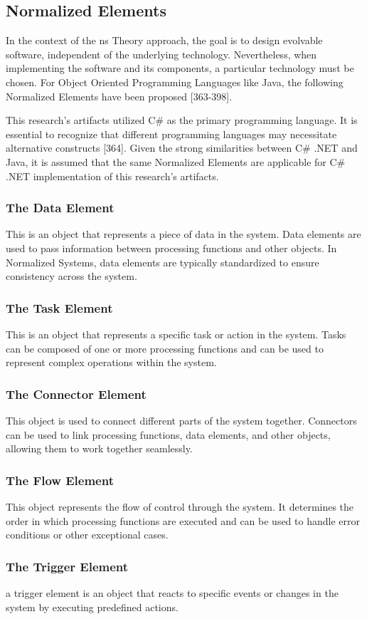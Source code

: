 \subsection{Normalized Elements} \label{subsec:ns_elements} 

In the context of the \gls{ns} Theory approach, the goal is to design evolvable software,
independent of the underlying technology. Nevertheless, when implementing the software and
its components, a particular technology must be chosen. For Object Oriented Programming
Languages like Java, the following Normalized Elements have been proposed
\parencite{mannaert_normalized_2016}[363-398].

This research's artifacts utilized C\# as the primary programming language. It is essential
to recognize that different programming languages may necessitate alternative constructs
\parencite{mannaert_normalized_2016}[364]. Given the strong similarities between C\# .NET
and Java, it is assumed that the same Normalized Elements are applicable for C\# .NET
implementation of this research's artifacts.

\subsubsection{The Data Element}
This is an object that represents a piece of data in the system. Data elements are used to
pass information between processing functions and other objects. In Normalized Systems,
data elements are typically standardized to ensure consistency across the system.

\subsubsection{The Task Element}
This is an object that represents a specific task or action in the system. Tasks can be
composed of one or more processing functions and can be used to represent complex
operations within the system.

\subsubsection{The Connector Element}
This object is used to connect different parts of the system together. Connectors can be
used to link processing functions, data elements, and other objects, allowing them to work
together seamlessly.

\subsubsection{The Flow Element}
This object represents the flow of control through the system. It determines the order in
which processing functions are executed and can be used to handle error conditions or
other exceptional cases.

\subsubsection{The Trigger Element}
a trigger element is an object that reacts to specific events or changes in the system
by executing predefined actions.